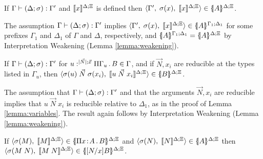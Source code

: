\documentclass{article}
\begin{document}
\begin{myproof}



\begin{lemma}
  \label{lemma:variables}
  If $\tctypej{\Delta}{\sigma}{\Gamma'}$ and $\interp{x}$ is defined then
  $\triple{\Gamma'}{\sigma(x)}{\interp{x}}\in\interpd{A}$.
\end{lemma}

\iftechreport
\begin{myproof}
  The assumption $\tctypej{\Delta}{\sigma}{\Gamma'}$ implies
  $\triple{\Gamma'}{\sigma(x)}{\interp{x}}\in\interpd[\iargs{\Gamma_1}{\Delta_1}]{A}$
  for some prefixes $\Gamma_1$ and $\Delta_1$ of $\Gamma$ and
  $\Delta$, respectively, and
  $\interpd[\iargs{\Gamma_1}{\Delta_1}]{A}=\interpd{A}$ by
  Interpretation Weakening (Lemma \ref{lemma:weakening}).
\end{myproof}
\fi


\begin{lemma}
  \label{lemma:recursive-variables}
  If $\tctypej{\Delta}{\sigma}{\Gamma'}$ for
  $\guform{|\vec{N}|}{\vec{x}}{\pigamma{\Gamma_u}{B}}\in\Gamma$, and
  if $\vec{N},x_i$ are reducible at the types listed in $\Gamma_u$,
  then
  $\pair{\sigma(u)\;\vec{N}\;\sigma(x_i)}{\interp{u\;\vec{N}\;x_i}}\in\interpd{B}$.
\end{lemma}

\iftechreport
\begin{myproof}
  The assumption that $\tctypej{\Delta}{\sigma}{\Gamma'}$ and that the arguments
  $\vec{N},x_i$ are reducible implies that $u\;\vec{N}\;x_i$ is
  reducible relative to $\Delta_1$, as in the proof of Lemma
  \ref{lemma:variables}. The result again follows by Interpretation
  Weakening (Lemma \ref{lemma:weakening}).
\end{myproof}
\fi


\begin{lemma}
  \label{lemma:applications}
  If $\pair{\sigma(M)}{\interp{M}}\in\interpd{\pitype{x}{A}{B}}$ and
  $\pair{\sigma(N)}{\interp{N}}\in\interpd{A}$ then
  $\pair{\sigma(M\;N)}{\interp{M\;N}}\in\interpd{[N/x]B}$.
\end{lemma}


\end{myproof}
\end{document}
